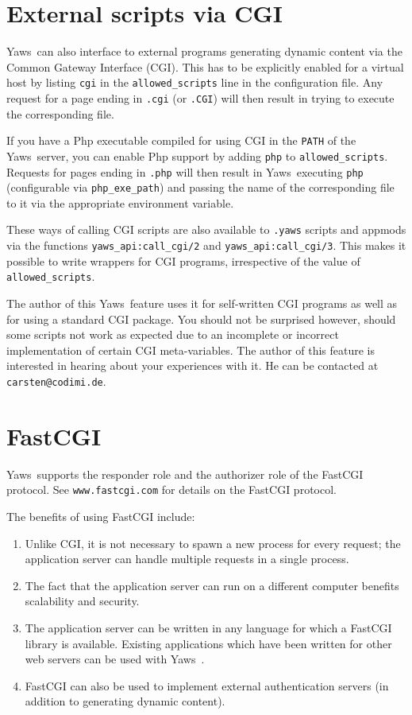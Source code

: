 \documentclass[11pt,oneside,english]{book}
\newcommand{\Yaws}            %
        {{\sc Yaws}}
\begin{document}
\chapter{External scripts via CGI}

\Yaws\  can also interface to external programs generating dynamic
content via the Common Gateway Interface (CGI).  This has to be
explicitly enabled for a virtual host by listing \verb+cgi+ in the
\verb+allowed_scripts+ line in the configuration file.  Any request
for a page ending in \verb+.cgi+ (or \verb+.CGI+) will then result in
trying to execute the corresponding file.

If you have a Php executable compiled for using CGI in the \verb+PATH+
of the \Yaws\  server, you can enable Php support by adding \verb+php+ to
\verb+allowed_scripts+.  Requests for pages ending in \verb+.php+ will
then result in \Yaws\  executing \verb+php+ (configurable via
\verb+php_exe_path+) and passing the name of the corresponding file to
it via the appropriate environment variable.

These ways of calling CGI scripts are also available to \verb+.yaws+
scripts and appmods via the functions \verb+yaws_api:call_cgi/2+ and
\verb+yaws_api:call_cgi/3+.  This makes it possible to write wrappers
for CGI programs, irrespective of the value of \verb+allowed_scripts+.

The author of this \Yaws\  feature uses it for self-written CGI programs
as well as for using a standard CGI package.  You should not be
surprised however, should some scripts not work as expected due to an
incomplete or incorrect implementation of certain CGI meta-variables.
The author of this feature is interested in hearing about your
experiences with it.  He can be contacted at \verb+carsten@codimi.de+.

\chapter{FastCGI}

\Yaws\  supports the responder role and the authorizer role of the
FastCGI protocol. See \verb+www.fastcgi.com+ for details on the
FastCGI protocol.

The benefits of using FastCGI include:
\begin{enumerate}
\item Unlike CGI, it is not necessary to spawn a new process for
every request; the application server can handle multiple requests
in a single process.
\item The fact that the application server can run on a different
computer benefits scalability and security.
\item The application server can be written in any language for
which a FastCGI library is available. Existing applications
which have been written for other web servers can be used with
\Yaws\ .
\item FastCGI can also be used to implement external authentication
servers (in addition to generating dynamic content).
\end{enumerate}
\end{document}

